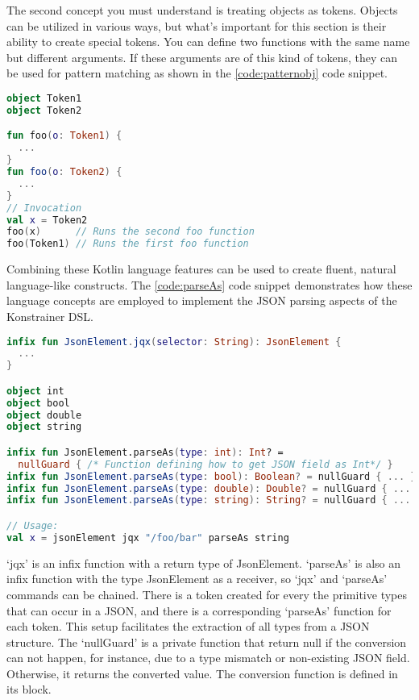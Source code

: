 The second concept you must understand is treating objects as tokens. Objects can be utilized in various ways, but what's important for this section is their ability to create special tokens. You can define two functions with the same name but different arguments. If these arguments are of this kind of tokens, they can be used for pattern matching as shown in the \ref{code:patternobj} code snippet.

\begin{lstlisting}[caption={Pattern matching},language=Kotlin,label=code:patternobj]
object Token1
object Token2

fun foo(o: Token1) {
  ...
}
fun foo(o: Token2) {
  ...
}
// Invocation
val x = Token2
foo(x)      // Runs the second foo function
foo(Token1) // Runs the first foo function
\end{lstlisting}

Combining these Kotlin language features can be used to create fluent, natural language-like constructs. The \ref{code:parseAs} code snippet demonstrates how these language concepts are employed to implement the JSON parsing aspects of the Konstrainer DSL.

\begin{lstlisting}[caption={JSON parsing implementation},language=Kotlin,label=code:parseAs]
infix fun JsonElement.jqx(selector: String): JsonElement {
  ...
}

object int
object bool
object double
object string

infix fun JsonElement.parseAs(type: int): Int? = 
  nullGuard { /* Function defining how to get JSON field as Int*/ }
infix fun JsonElement.parseAs(type: bool): Boolean? = nullGuard { ... }
infix fun JsonElement.parseAs(type: double): Double? = nullGuard { ... }
infix fun JsonElement.parseAs(type: string): String? = nullGuard { ... }

// Usage:
val x = jsonElement jqx "/foo/bar" parseAs string
\end{lstlisting}

`jqx' is an infix function with a return type of JsonElement. `parseAs' is also an infix function with the type JsonElement as a receiver, so `jqx' and `parseAs' commands can be chained. There is a token created for every the primitive types that can occur in a JSON, and there is a corresponding `parseAs' function for each token. This setup facilitates the extraction of all types from a JSON structure. The `nullGuard' is a private function that return null if the conversion can not happen, for instance, due to a type mismatch or non-existing JSON field. Otherwise, it returns the converted value. The conversion function is defined in its block.
